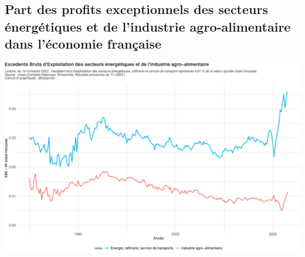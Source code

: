 \documentclass[
  paper=a4,
  ,captions=tableheading
]{scrartcl}
\begin{document}
\hypertarget{part-des-profits-exceptionnels-des-secteurs-uxe9nerguxe9tiques-et-de-lindustrie-agro-alimentaire-dans-luxe9conomie-franuxe7aise}{%
\subsection{Part des profits exceptionnels des secteurs énergétiques et
de l'industrie agro-alimentaire dans l'économie
française}\label{part-des-profits-exceptionnels-des-secteurs-uxe9nerguxe9tiques-et-de-lindustrie-agro-alimentaire-dans-luxe9conomie-franuxe7aise}}

\includegraphics{rapport_pdf_compte_branche_files/figure-latex/unnamed-chunk-30-1.pdf}
\end{document}
